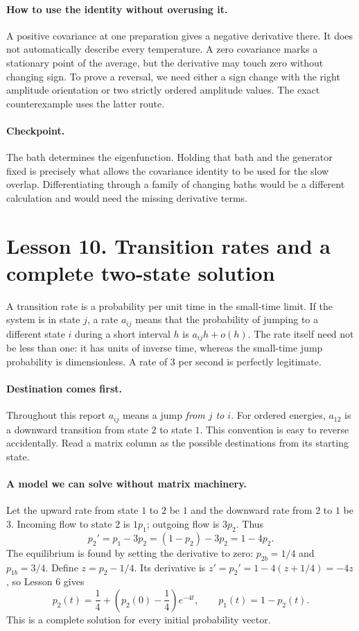\documentclass[11pt]{article}
\begin{document}
\paragraph{How to use the identity without overusing it.}
A positive covariance at one preparation gives a negative derivative there.
It does not automatically describe every temperature. A zero covariance marks
a stationary point of the average, but the derivative may touch zero without
changing sign. To prove a reversal, we need either a sign change with the
right amplitude orientation or two strictly ordered amplitude values.
The exact counterexample uses the latter route.

\paragraph{Checkpoint.}
The bath determines the eigenfunction. Holding that bath and the generator
fixed is precisely what allows the covariance identity to be used for the
slow overlap. Differentiating through a family of changing baths would be a
different calculation and would need the missing derivative terms.

\clearpage
\section*{Lesson 10. Transition rates and a complete two-state solution}
A transition rate is a probability per unit time in the small-time limit.
If the system is in state $j$, a rate $a_{ij}$ means that the probability of
jumping to a different state $i$ during a short interval $h$ is
$a_{ij}h+o(h)$. The rate itself need not be less than one: it has units of
inverse time, whereas the small-time jump probability is dimensionless.
A rate of $3$ per second is perfectly legitimate.

\paragraph{Destination comes first.}
Throughout this report $a_{ij}$ means a jump \emph{from $j$ to $i$}.
For ordered energies, $a_{12}$ is a downward transition from state $2$ to
state $1$. This convention is easy to reverse accidentally. Read a matrix
column as the possible destinations from its starting state.

\paragraph{A model we can solve without matrix machinery.}
Let the upward rate from state $1$ to $2$ be $1$ and the downward rate from
$2$ to $1$ be $3$. Incoming flow to state $2$ is $1p_1$; outgoing flow is
$3p_2$. Thus
\[
p_2'=p_1-3p_2=(1-p_2)-3p_2=1-4p_2.
\]
The equilibrium is found by setting the derivative to zero:
$p_{2b}=1/4$ and $p_{1b}=3/4$. Define $z=p_2-1/4$. Its derivative is
$z'=p_2'=1-4(z+1/4)=-4z$, so Lesson 6 gives
\[
p_2(t)=\frac14+\left(p_2(0)-\frac14\right)e^{-4t},
\qquad p_1(t)=1-p_2(t).
\]
This is a complete solution for every initial probability vector.
\end{document}
